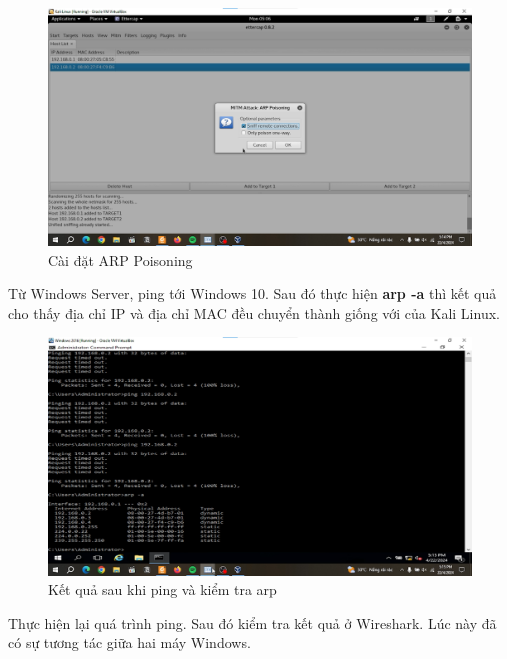 \begin{figure}[!htb]
    \centering
    \includegraphics[width=1\linewidth]{figure//chapter5//lab5_3/arp-poisoning.png}
    \caption{Cài đặt ARP Poisoning}
    \label{fig:enter-label}
\end{figure}

 Từ Windows Server, ping tới Windows 10. Sau đó thực hiện \textbf{arp -a} thì kết quả cho thấy địa chỉ IP và địa chỉ MAC đều chuyển thành giống với của Kali Linux. 

\begin{figure}[!htb]
    \centering
    \includegraphics[width=1\linewidth]{figure//chapter5//lab5_3/result_arp.png}
    \caption{Kết quả sau khi ping và kiểm tra arp}
    \label{fig:enter-label}
\end{figure}

\newpage

 Thực hiện lại quá trình ping. Sau đó kiểm tra kết quả ở Wireshark. Lúc này đã có sự tương tác giữa hai máy Windows.

